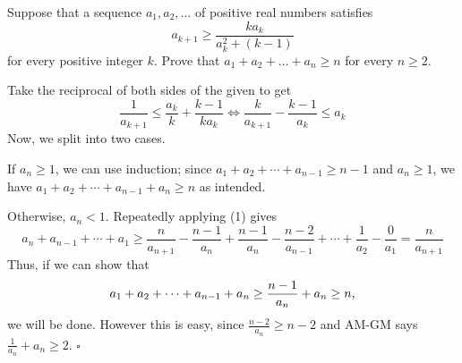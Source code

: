 
\begin{problem}[ISL 2015 A1]
    Suppose that a sequence $a_1,a_2,\ldots$ of positive real numbers satisfies \[a_{k+1}\geq\frac{ka_k}{a_k^2+(k-1)}\] for every positive integer $k$. Prove that $a_1+a_2+\ldots+a_n\geq n$ for every $n\geq2$.
\end{problem}
\begin{solution}
    Take the reciprocal of both sides of the given to get
    \[\frac{1}{a_{k+1}} \leq \frac{a_k}{k} + \frac{k-1}{ka_k} \Longleftrightarrow \frac{k}{a_{k+1}} - \frac{k-1}{a_k} \leq a_k \tag{1}\]
    Now, we split into two cases.
    
    If $a_n \geq 1$, we can use induction; since $a_1 + a_2 + \cdots + a_{n-1} \geq n-1$ and $a_n \geq 1$, we have $a_1 + a_2 + \cdots + a_{n-1} + a_n \geq n$ as intended.
    
    Otherwise, $a_n < 1$. Repeatedly applying (1) gives \[a_n + a_{n-1} + \cdots + a_1 \geq \frac{n}{a_{n+1}} - \frac{n-1}{a_n} + \frac{n-1}{a_n} - \frac{n-2}{a_{n-1}} + \cdots + \frac{1}{a_2} - \frac{0}{a_1} = \frac{n}{a_{n+1}}\] Thus, if we can show that \[a_1 + a_2 + \cdots + a_{n-1} + a_n \geq \frac{n-1}{a_n} + a_n \geq n\text,\] we will be done. However this is easy, since $\frac{n-2}{a_n} \geq n-2$ and AM-GM says $\frac{1}{a_n} + a_n \geq 2$. $\square$
\end{solution}
